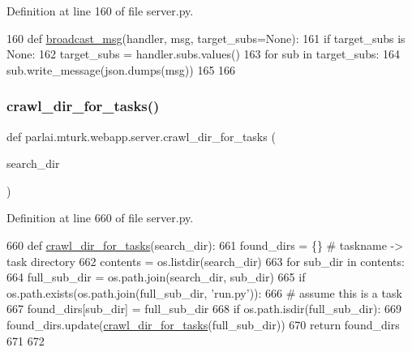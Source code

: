 Definition at line 160 of file server.\+py.


\begin{DoxyCode}
160 \textcolor{keyword}{def }\hyperlink{namespaceparlai_1_1mturk_1_1webapp_1_1server_aff248adb38d13b62a05e7d5649321d64}{broadcast\_msg}(handler, msg, target\_subs=None):
161     \textcolor{keywordflow}{if} target\_subs \textcolor{keywordflow}{is} \textcolor{keywordtype}{None}:
162         target\_subs = handler.subs.values()
163     \textcolor{keywordflow}{for} sub \textcolor{keywordflow}{in} target\_subs:
164         sub.write\_message(json.dumps(msg))
165 
166 
\end{DoxyCode}
\mbox{\label{namespaceparlai_1_1mturk_1_1webapp_1_1server_a0f5381b2282125d20fe12c40f6ed2ad3}} 
\subsubsection{\texorpdfstring{crawl\+\_\+dir\+\_\+for\+\_\+tasks()}{crawl\_dir\_for\_tasks()}}
{\footnotesize\ttfamily def parlai.\+mturk.\+webapp.\+server.\+crawl\+\_\+dir\+\_\+for\+\_\+tasks (\begin{DoxyParamCaption}\item[{}]{search\+\_\+dir }\end{DoxyParamCaption})}



Definition at line 660 of file server.\+py.


\begin{DoxyCode}
660 \textcolor{keyword}{def }\hyperlink{namespaceparlai_1_1mturk_1_1webapp_1_1server_a0f5381b2282125d20fe12c40f6ed2ad3}{crawl\_dir\_for\_tasks}(search\_dir):
661     found\_dirs = \{\}  \textcolor{comment}{# taskname -> task directory}
662     contents = os.listdir(search\_dir)
663     \textcolor{keywordflow}{for} sub\_dir \textcolor{keywordflow}{in} contents:
664         full\_sub\_dir = os.path.join(search\_dir, sub\_dir)
665         \textcolor{keywordflow}{if} os.path.exists(os.path.join(full\_sub\_dir, \textcolor{stringliteral}{'run.py'})):
666             \textcolor{comment}{# assume this is a task}
667             found\_dirs[sub\_dir] = full\_sub\_dir
668         \textcolor{keywordflow}{if} os.path.isdir(full\_sub\_dir):
669             found\_dirs.update(\hyperlink{namespaceparlai_1_1mturk_1_1webapp_1_1server_a0f5381b2282125d20fe12c40f6ed2ad3}{crawl\_dir\_for\_tasks}(full\_sub\_dir))
670     \textcolor{keywordflow}{return} found\_dirs
671 
672 
\end{DoxyCode}
\mbox{\label{namespaceparlai_1_1mturk_1_1webapp_1_1server_a493aeecfa7d5201aa13a7f03cdbc59cf}} 
